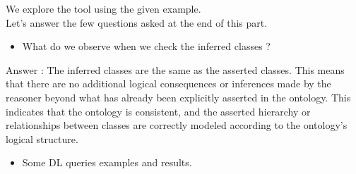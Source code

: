 

We explore the tool using the given example. \\

Let's answer the few questions asked at the end of this part.
\\

\smallskip
\begin{itemize}
    \item What do we observe when we check the inferred classes ?
\end{itemize}
\smallskip
Answer :    The inferred classes are the same as the asserted classes. This means that there are no additional logical consequences or inferences made by the reasoner beyond what has already been explicitly asserted in the ontology. This indicates that the ontology is consistent, and the asserted hierarchy or relationships between classes are correctly modeled according to the ontology's logical structure.

\begin{itemize}
    \item Some DL queries examples and results.
\end{itemize}

